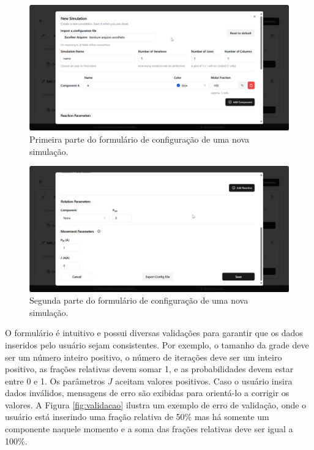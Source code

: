 \documentclass[12pt,oneside]{report}
\begin{document}
\begin{figure}[H]
    \centering
    \includegraphics[width=1\textwidth]{interface_configuracao.png}
    \caption{\small Primeira parte do formulário de configuração de uma nova simulação.}
    \label{fig:interface_configuracao1}
\end{figure}

\begin{figure}[H]
    \centering
    \includegraphics[width=1\textwidth]{interface_configuracao2.png}
    \caption{\small Segunda parte do formulário de configuração de uma nova simulação.}
    \label{fig:interface_configuracao2}
\end{figure}

O formulário é intuitivo e possui diversas validações para garantir que os dados inseridos pelo usuário sejam consistentes. Por exemplo, o tamanho da grade deve ser um número inteiro positivo, o número de iterações deve ser um inteiro positivo, as frações relativas devem somar 1, e as probabilidades devem estar entre 0 e 1. Os parâmetros $J$ aceitam valores positivos. Caso o usuário insira dados inválidos, mensagens de erro são exibidas para orientá-lo a corrigir os valores. A Figura \ref{fig:validacao} ilustra um exemplo de erro de validação, onde o usuário está inserindo uma fração relativa de 50\% mas há somente um componente naquele momento e a soma das frações relativas deve ser igual a 100\%.
\end{document}
